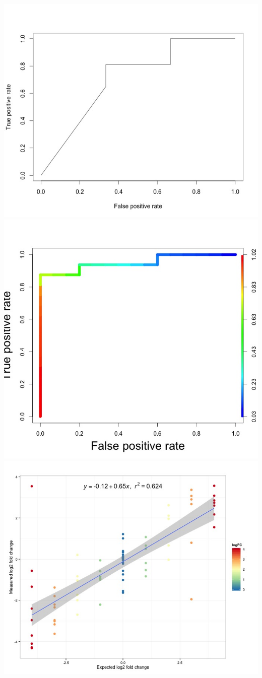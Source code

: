 \documentclass[]{article}
\begin{document}
\includegraphics{ROCSample.jpeg} \includegraphics{ROCSampleColour.jpeg}
\includegraphics{ScatterLFCSample.jpeg}
\end{document}
